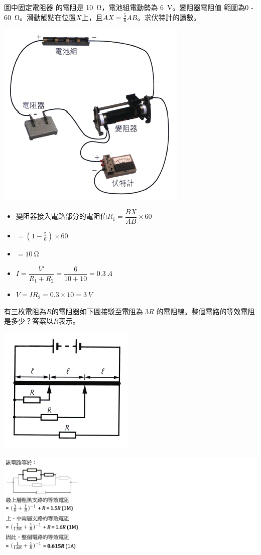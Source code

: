 {
    圖中固定電阻器 的電阻是 \qty{10}{\ohm}，電池組電動勢為 \qty{6}{V}。變阻器電阻值 範圍為0 - \qty{60}{\ohm}。滑動觸點在位置$X$上，且$AX=\frac{5}{6}AB$。求伏特計的讀數。
    \par{\par\centering\includegraphics[width=.35\textwidth]{./img/ch2_circuit_lq_2024-06-14-14-10-27.png}\par}
}{
    \begin{itemize}
        \item[] 變阻器接入電路部分的電阻值$R_1=\dfrac{BX}{AB}\times 60$
        \item[]  $=(1-\frac{5}{6})\times 60$
        \item [] $= \qty{10}{\ohm}$\giveM
        \item[]  $I=\dfrac{V'}{R_1+R_2}=\dfrac{6}{10+10}=\qty{0.3}{A}$\giveM
        \item[]  $V=IR_2=0.3\times 10=\qty{3}{V}$\giveA
    \end{itemize}

}


{
    有三枚電阻為$R$的電阻器如下圖接駁至電阻為 $3R$ 的電阻線。整個電路的等效電阻是多少？答案以$R$表示。
    \par{\par\centering\includegraphics[width=.35\textwidth]{./img/ch2_circuit_lq_2024-06-14-14-12-24.png}\par}

}{
    \par{\par\centering\includegraphics[width=\textwidth]{./img/ch2_circuit_lq_2024-06-16-12-13-04.png}\par}

}

